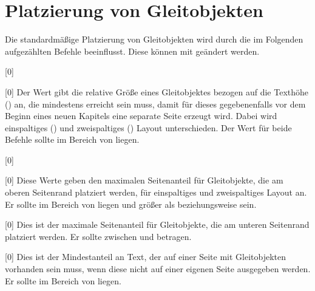 \section{Platzierung von Gleitobjekten}
\label{sec:tips:floats}%
%
%
Die standardmäßige Platzierung von Gleitobjekten wird durch die im Folgenden 
aufgezählten Befehle beeinflusst. Diese können mit 
 geändert werden.

\begin{Declaration}{}[0\floatpagefraction]
\begin{Declaration}{}[0\dblfloatpagefraction]
\printdeclarationlist*%
%
Der Wert gibt die relative Größe eines Gleitobjektes bezogen auf die Texthöhe 
() an, die mindestens erreicht sein muss, damit für dieses 
gegebenenfalls vor dem Beginn eines neuen Kapitels eine separate Seite erzeugt 
wird. Dabei wird einspaltiges () und zweispaltiges 
() Layout unterschieden. Der Wert für beide 
Befehle sollte im Bereich von  liegen.
\end{Declaration}
\end{Declaration}

\begin{Declaration}{}[0\topfraction]
\begin{Declaration}{}[0\dbltopfraction]
\printdeclarationlist*%
%
Diese Werte geben den maximalen Seitenanteil für Gleitobjekte, die am oberen 
Seitenrand platziert werden, für einspaltiges und zweispaltiges Layout an. Er 
sollte im Bereich von  liegen und größer als 
 beziehungsweise  sein.
\end{Declaration}
\end{Declaration}

\begin{Declaration}{}[0\bottomfraction]
\printdeclarationlist*%
%
Dies ist der maximale Seitenanteil für Gleitobjekte, die am unteren Seitenrand 
platziert werden. Er sollte zwischen  und  betragen.
\end{Declaration}

\begin{Declaration}{}[0\textfraction]
\printdeclarationlist*%
%
Dies ist der Mindestanteil an Text, der auf einer Seite mit Gleitobjekten 
vorhanden sein muss, wenn diese nicht auf einer eigenen Seite ausgegeben 
werden. Er sollte im Bereich von  liegen.
\end{Declaration}

